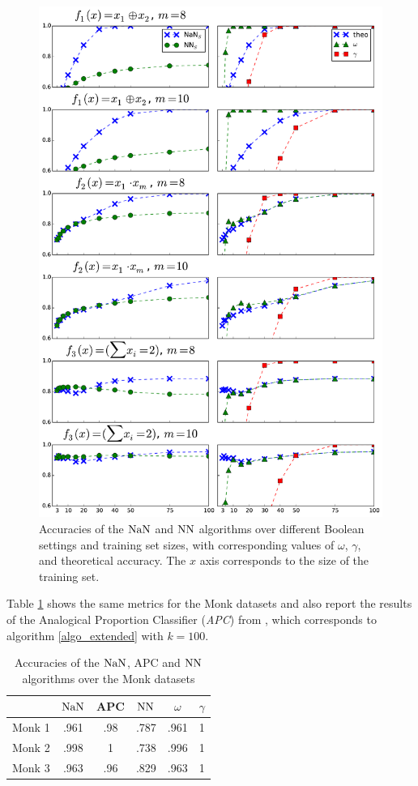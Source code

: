 {\begin{figure}[h!]
\caption{Accuracies of the $\mbox{NaN}$ and $\mbox{NN}$ algorithms  over different Boolean
  settings and training set sizes, with corresponding values of $\omega$,
  $\gamma$, and theoretical accuracy. The $x$ axis corresponds to the size of
the training set.}
\label{plots}
\includegraphics[width=\linewidth ]{figures/ecai_plots.pdf}
\end{figure}

Table \ref{TABLE_MONK} shows the same metrics for the Monk datasets and
also report the results of the Analogical Proportion Classifier (\textit{APC})
from \cite{MicBayDelJAIR08}, which corresponds to algorithm
\ref{algo_extended} with $k=100$.

\begin{table}
\centering
\caption{Accuracies of the $\mbox{NaN}$, APC and $\mbox{NN}$ algorithms over the Monk datasets}
\label{TABLE_MONK}
\begin{tabular}{| c | c | c | c | c | c |}
\toprule
& $\mbox{NaN}$  & APC & $\mbox{NN}$  &  $\omega$ & $\gamma$ \\
\midrule
Monk 1 & .961 & .98 & .787 &   .961    &   1 \\
Monk 2 & .998 & 1 & .738 &    .996    &   1 \\
Monk 3 & .963 & .96 & .829 &   .963    &   1 \\
\bottomrule
\end{tabular}
\end{table}

}
